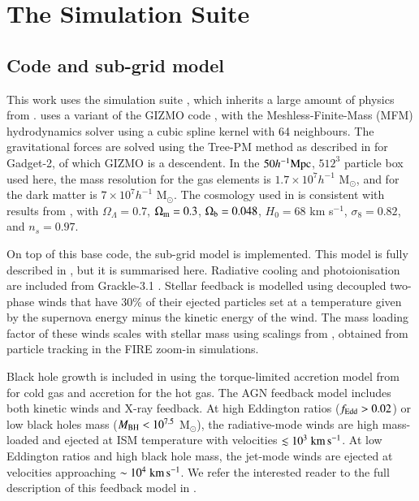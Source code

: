 \section{The \simba{} Simulation Suite}
\label{sec:simba}

\subsection{Code and sub-grid model}

This work uses the \simba{} simulation suite \citep{Dave2019}, which inherits
a large amount of physics from \mufasa{} \citep{Dave2016}. \simba{} uses a
variant of the GIZMO code \citep{Hopkins2015}, with the Meshless-Finite-Mass
(MFM) hydrodynamics solver using a cubic spline kernel with
64 neighbours. The gravitational forces are solved using the Tree-PM method
as described in \citet{Springel2005b} for Gadget-2, of which GIZMO is a
descendent. In the $50 h^{-1}{\rm Mpc}{}$, $512^3$ particle box used here, the mass
resolution for the gas elements is $1.7\times10^7h^{-1}$ M$_\odot$, and for
the dark matter is $7\times10^7h^{-1}$ M$_\odot$. The cosmology used in
\simba{} is consistent with results from \citet{PlanckCollaboration2016},
with $\Omega_\Lambda = 0.7$, $\Omega_{\rm m} = 0.3$, $\Omega_{\rm b} =
0.048$, $H_0 = 68$ km s$^{-1}$, $\sigma_8=0.82$, and $n_s=0.97$.

On top of this base code, the \simba{} sub-grid model is implemented. This
model is fully described in \citet{Dave2019}, but it is summarised here.
Radiative cooling and photoionisation are included from Grackle-3.1
\citep{Smith2016}. Stellar feedback is modelled using decoupled two-phase
winds that have 30\% of their ejected particles set at a temperature given by
the supernova energy minus the kinetic energy of the wind. The mass loading
factor of these winds scales with stellar mass using scalings from
\citet{AnglesAlcazar2017}, obtained from particle tracking in the FIRE
zoom-in simulations.

Black hole growth is included in \simba{} using the torque-limited accretion
model from \citet{AnglesAlcazar2017b} for cold gas and \citet{Bondi1952}
accretion for the hot gas. The AGN feedback model includes both kinetic winds
and X-ray feedback. At high Eddington ratios ($f_{\rm Edd} > 0.02$) or low
black holes mass ($M_{\rm BH} < 10^{7.5}$ M$_\odot$), the radiative-mode
winds are high mass-loaded and ejected at ISM temperature with velocities
$\lesssim 10^3 \;{\rm km}\,{\rm s}^{-1}{}$. At low Eddington ratios and high black hole mass, the
jet-mode winds are ejected at velocities approaching $\sim 10^4\;{\rm km}\,{\rm s}^{-1}{}$. We
refer the interested reader to the full description of this feedback model in
\citet{Dave2019}.


